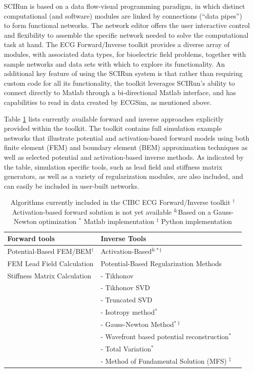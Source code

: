 SCIRun is based on a data flow-visual programming paradigm, in which distinct
computational (and software) modules are linked by connections (``data
pipes'') to form functional networks. The network editor offers the user
interactive control and flexibility to assemble the specific network needed to
solve the computational task at hand.
The ECG Forward/Inverse toolkit provides
a diverse array of modules, with associated data types, for bioelectric field problems,
together with sample networks and data sets with which to explore its
functionality.
An additional key feature of using the SCIRun system is
that rather than requiring custom code for all its functionality, the
toolkit leverages SCIRun's ability to
connect directly to Matlab through a
bi-directional Matlab interface, and has capabilities to read in data
created by ECGSim, as mentioned above.

Table \ref{tab:prop} lists currently available forward and inverse
approaches explicitly provided within the toolkit. The toolkit contains
full simulation example networks that illustrate potential and
activation-based forward models using both finite element (FEM) and boundary
element (BEM) approximation techniques as well as selected potential and
activation-based inverse methods. As indicated by the table,
simulation specific tools, such as lead field and stiffness matrix
generators, as well as a variety of regularization modules, are also
included, and can easily be included in user-built networks.

\begin{table}[htb]
\begin{tabular}{|ll|l|}
\hline
{\bf Forward tools} & {\bf Inverse Tools}\\ \hline
\hline
Potential-Based FEM/BEM$^\dag$ & Activation-Based$^{\&*\ddag}$\\ \hline
FEM Lead Field Calculation& Potential-Based Regularization  Methods\\ \hline
Stiffness Matrix Calculation &   -  Tikhonov  \\ \hline
 &- Tikhonov SVD  \\ \hline
 & - Truncated SVD\\ \hline
 & - Isotropy method$^{*}$\\ \hline
 & - Gauss-Newton Method$^{*\ddag}$\\ \hline
 & - Wavefront based potential reconstruction$^*$\\ \hline
 & - Total Variation$^{*}$ \\ \hline
 & - Method of Fundamental Solution (MFS) $^\ddag$\\ \hline
\end{tabular}
\caption{Algorithms currently included in the CIBC ECG Forward/Inverse
toolkit \newline
$^\dag$Activation-based forward solution is not yet
available\newline
$^{\&}$Based on a Gauss-Newton optimization \newline
$^{*}$ Matlab implementation
$^\ddag$ Python implementation
}
\label{tab:prop}
\end{table}


